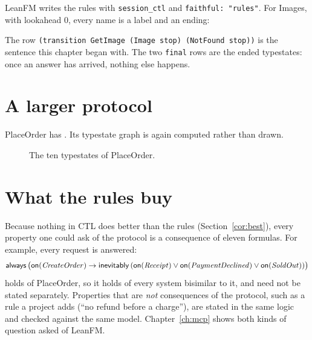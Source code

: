 LeanFM writes the rules with \texttt{session\_ctl} and \texttt{faithful: "rules"}. For
Images, with lookahead $0$, every name is a label and an ending:


The row \texttt{(transition GetImage (Image stop) (NotFound stop))} is the sentence this
chapter began with. The two \texttt{final} rows are the ended typestates: once an answer has
arrived, nothing else happens.

\section{A larger protocol}

PlaceOrder has \unskip. Its typestate graph is again
computed rather than drawn.

\begin{figure}[ht]
\centering
{}
\caption{The ten typestates of PlaceOrder.}
\label{fig:placeorder-ts}
\end{figure}


\section{What the rules buy}

Because nothing in CTL does better than the rules (Section~\ref{cor:best}), every property one could ask of the protocol is a
consequence of eleven formulas. For example, every request is answered:
\[
\mathsf{always}\,\big(\mathsf{on}(\mathit{CreateOrder}) \rightarrow \mathsf{inevitably}\,(\mathsf{on}(\mathit{Receipt})\vee\mathsf{on}(\mathit{PaymentDeclined})\vee\mathsf{on}(\mathit{SoldOut}))\big)
\]
holds of PlaceOrder, so it holds of every system bisimilar to it, and need not be
stated separately. Properties that are \emph{not} consequences of the protocol, such as
a rule a project adds (``no refund before a charge''), are stated in the same logic and
checked against the same model. Chapter~\ref{ch:mcp} shows both kinds of question asked
of LeanFM.

